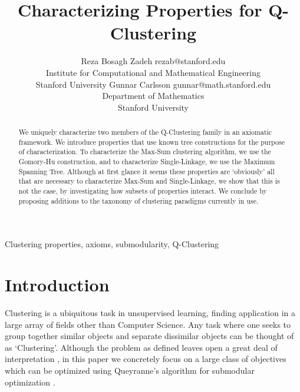 \documentclass[twoside,11pt]{article}
\begin{document}
\title{Characterizing Properties for Q-Clustering}
       
\author{\name Reza Bosagh Zadeh \email rezab@stanford.edu\\
   \addr Institute for Computational and Mathematical Engineering \\
    Stanford University
    \AND
\name Gunnar Carlsson \email gunnar@math.stanford.edu\\
   \addr Department of Mathematics\\
    Stanford University
}



\maketitle

\begin{abstract}We uniquely characterize two members of the Q-Clustering family in an axiomatic framework. 
We introduce properties that use known tree constructions for the purpose of characterization.
To characterize the Max-Sum
clustering algorithm, we use the Gomory-Hu construction, and to characterize Single-Linkage, we
use the Maximum Spanning Tree. 
Although at first glance it seems these properties are `obviously' all that are necessary to characterize Max-Sum and Single-Linkage, we show that this is not the case, by investigating how subsets of properties interact. We conclude by proposing additions to
the taxonomy of clustering paradigms currently in use.
\end{abstract}

\begin{keywords}
  Clustering properties, axioms, submodularity, Q-Clustering
\end{keywords}

\section{Introduction}

Clustering is a ubiquitous task in unsupervised learning, finding application in a large array of fields other than Computer Science.
Any task where one seeks to group together similar objects and separate dissimilar objects can be thought of as `Clustering'.
Although the problem as defined leaves open a great deal of interpretation \citep{avrimthoughts, ulrikethoughts}, in this
paper we concretely focus on a large class of objectives which can be optimized using Queyranne's algorithm for submodular optimization \citep{queyranne,rizzi}.
\end{document}
